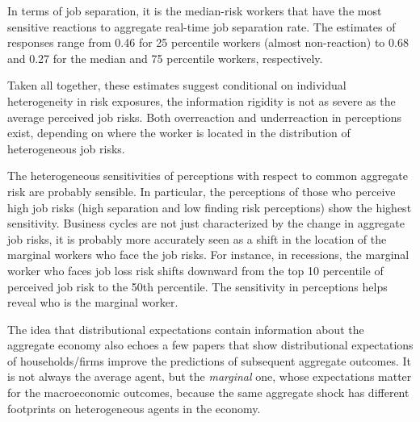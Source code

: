 In terms of job separation, it is the median-risk workers that have the most sensitive reactions to aggregate real-time job separation rate. The estimates of responses range from 0.46 for 25 percentile workers (almost non-reaction) to 0.68 and 0.27 for the median and 75 percentile workers, respectively.

Taken all together, these estimates suggest conditional on individual heterogeneity in risk exposures, the information rigidity is not as severe as the average perceived job risks. Both overreaction and underreaction in perceptions exist, depending on where the worker is located in the distribution of heterogeneous job risks.

The heterogeneous sensitivities of perceptions with respect to common aggregate risk are probably sensible. In particular, the perceptions of those who perceive high job risks (high separation and low finding risk perceptions) show the highest sensitivity. Business cycles are not just characterized by the change in aggregate job risks, it is probably more accurately seen as a shift in the location of the marginal workers who face the job risks. For instance, in recessions, the marginal worker who faces job loss risk shifts downward from the top 10 percentile of perceived job risk to the 50th percentile. The sensitivity in perceptions helps reveal who is the marginal worker. 

The idea that distributional expectations contain information about the aggregate economy also echoes a few papers that show distributional expectations of households/firms improve the predictions of subsequent aggregate outcomes. It is not always the average agent, but the \emph{marginal} one, whose expectations matter for the macroeconomic outcomes, because the same aggregate shock has different footprints on heterogeneous agents in the economy. 

